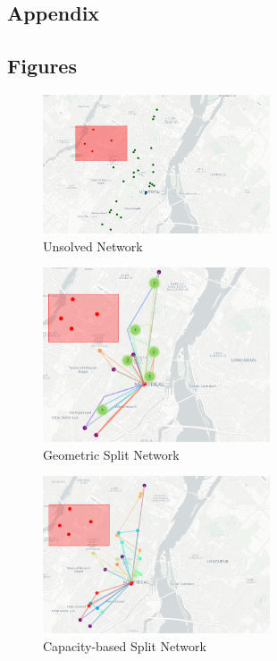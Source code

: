 \documentclass[12pt]{article}
\begin{document}
\begin{appendices}
    \section{Appendix}
    \subsection{Figures}\label{app:figures}
    \begin{figure}[!htb]
        \centering
        \includegraphics[width=0.6\textwidth]{unsolved-network.png}
        \caption{Unsolved Network}
        \label{fig:unsolved-network}
    \end{figure}

    \begin{figure}[!htb]
        \centering
        \includegraphics[width=0.6\textwidth]{geometric-network.png}
        \caption{Geometric Split Network}
        \label{fig:geometric-network}
    \end{figure}

    \begin{figure}[!htb]
        \centering
        \includegraphics[width=0.6\textwidth]{capacity-network.png}
        \caption{Capacity-based Split Network}
        \label{fig:capacity-network}
    \end{figure}


\end{appendices}
\end{document}
